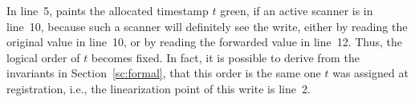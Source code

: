 In line~5,  paints the allocated timestamp $t$ green, if
an active scanner is in line~10, because such a scanner will
definitely see the write, either by reading the original value in
line~10, or by reading the forwarded value in line~12. Thus, the
logical order of $t$ becomes fixed. In fact, it is possible to derive
from the invariants in Section~\ref{sc:formal}, that this order is the
same one $t$ was assigned at registration, i.e., the linearization
point of this write is line~2.

%
%

%



